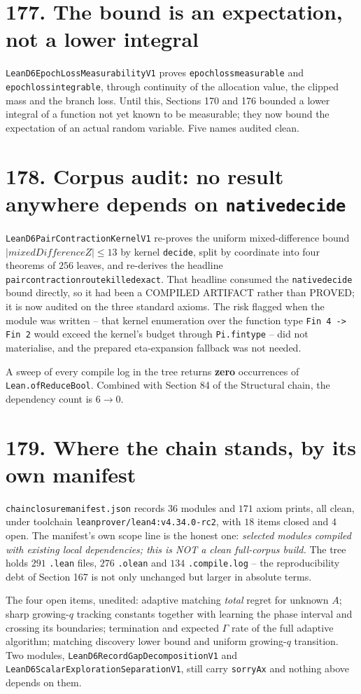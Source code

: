 \documentclass[9pt,twocolumn]{article}
\renewcommand{\_}{\CIGunderscore\allowbreak}
\begin{document}
\section*{177. The bound is an expectation, not a lower integral}
\texttt{LeanD6EpochLossMeasurabilityV1} proves \texttt{epoch\_loss\_measurable} and \texttt{epoch\_loss\_integrable}, through continuity of the allocation value, the clipped mass and the branch loss. Until this, Sections 170 and 176 bounded a lower integral of a function not yet known to be measurable; they now bound the expectation of an actual random variable. Five names audited clean.

\section*{178. Corpus audit: no result anywhere depends on \texttt{native\_decide}}
\texttt{LeanD6PairContractionKernelV1} re-proves the uniform mixed-difference bound $|mixedDifferenceZ| \le 13$ by kernel \texttt{decide}, split by coordinate into four theorems of $256$ leaves, and re-derives the headline \texttt{pair\_contraction\_route\_killed\_exact}. That headline consumed the \texttt{native\_decide} bound directly, so it had been a COMPILED ARTIFACT rather than PROVED; it is now audited on the three standard axioms. The risk flagged when the module was written -- that kernel enumeration over the function type \texttt{Fin 4 -> Fin 2} would exceed the kernel's budget through \texttt{Pi.fintype} -- did not materialise, and the prepared eta-expansion fallback was not needed.

A sweep of every compile log in the tree returns \textbf{zero} occurrences of \texttt{Lean.ofReduceBool}. Combined with Section 84 of the Structural chain, the dependency count is $6 \to 0$.

\section*{179. Where the chain stands, by its own manifest}
\texttt{chain\_closure\_manifest.json} records $36$ modules and $171$ axiom prints, all clean, under toolchain \texttt{leanprover/lean4:v4.34.0-rc2}, with $18$ items closed and $4$ open. The manifest's own scope line is the honest one: \emph{selected modules compiled with existing local dependencies; this is NOT a clean full-corpus build.} The tree holds $291$ \texttt{.lean} files, $276$ \texttt{.olean} and $134$ \texttt{.compile.log} -- the reproducibility debt of Section 167 is not only unchanged but larger in absolute terms.

The four open items, unedited: adaptive matching \emph{total} regret for unknown $A$; sharp growing-$q$ tracking constants together with learning the phase interval and crossing its boundaries; termination and expected $\Gamma$ rate of the full adaptive algorithm; matching discovery lower bound and uniform growing-$q$ transition. Two modules, \texttt{LeanD6RecordGapDecompositionV1} and \texttt{LeanD6ScalarExplorationSeparationV1}, still carry \texttt{sorryAx} and nothing above depends on them.
\end{document}
